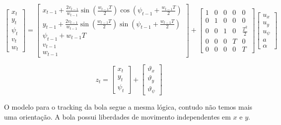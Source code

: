 \documentclass[a4paper,11pt]{article}
\begin{document}
\begin{equation}
\label{update_equation}
\begin{bmatrix} x_t \\ y_t \\ \psi_t \\ v_t \\ w_t \end{bmatrix}
= \begin{bmatrix}
x_{t-1}+\frac{2v_{t-1}}{w_{t-1}} \sin{\left(\frac{w_{t-1}T}{2}\right)}\cos{\left(\psi_{t-1}+\frac{w_{t-1}T}{2}\right)} \\
y_{t-1}+\frac{2v_{t-1}}{w_{t-1}} \sin{\left(\frac{w_{t-1}T}{2}\right)}\sin{\left(\psi_{t-1}+\frac{w_{t-1}T}{2}\right)} \\
\psi_{t-1}+w_{t-1}T \\ v_{t-1} \\ w_{t-1} \end{bmatrix} +
\begin{bmatrix} 1 & 0 & 0 & 0 & 0 \\ 0 & 1 & 0 & 0 & 0 \\ 0 & 0 & 1 & 0 & \frac{T^2}{2} \\ 0 & 0 & 0 & T & 0 \\ 0 & 0 & 0 & 0 & T \end{bmatrix}
\begin{bmatrix} u_x \\ u_y \\ u_{\psi} \\ a \\ \alpha \end{bmatrix}
\end{equation}

\begin{equation}
    \label{observation}
    z_t = 
    \begin{bmatrix} x_t \\ y_t \\ \psi_t \end{bmatrix}
    +
    \begin{bmatrix} \vartheta_x \\ \vartheta_y \\ \vartheta_{\psi} \end{bmatrix}
\end{equation}

O modelo para o tracking da bola segue a mesma lógica, contudo não temos mais uma orientação. A bola possui liberdades de movimento independentes em $x$ e $y$.
\end{document}
